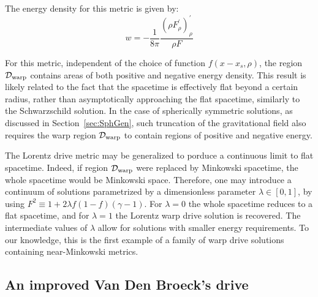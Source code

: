 \documentclass[10pt]{iopart}
\begin{document}
The energy density for this metric is given by:
\begin{equation}
   w = -\frac{1}{8\pi}\frac{(\rho F^\prime_\rho)^\prime_\rho}{\rho F}
\end{equation}

For this metric, independent of the choice of function $f(x-x_s,\rho)$, the region $\mathcal{D}_{\rm warp}$ contains areas of both positive and negative energy density. This result is likely related to the fact that the spacetime is effectively flat beyond a certain radius, rather than asymptotically approaching the flat spacetime, similarly to the Schwarzschild solution. In the case of spherically symmetric solutions, as discussed in Section~\ref{sec:SphGen}, such truncation of the gravitational field also requires the warp region $\mathcal{D}_{\rm warp}$ to contain regions of positive and negative energy.

The Lorentz drive metric may be generalized to porduce a continuous limit to flat spacetime. Indeed, if region $\mathcal{D}_{\rm warp}$ were replaced by Minkowski spacetime, the whole spacetime would be Minkowski space. Therefore, one may introduce a continuum of solutions parametrized by a dimensionless parameter $\lambda\in[0,1]$, by using $F^2\equiv 1+2\lambda f(1-f)(\gamma -1)$. For $\lambda = 0$ the whole spacetime reduces to a flat spacetime, and for $\lambda = 1$ the Lorentz warp drive solution is recovered. The intermediate values of $\lambda$ allow for solutions with smaller energy requirements. To our knowledge, this is the first example of a family of warp drive solutions containing near-Minkowski metrics.


\subsection{An improved Van Den Broeck's drive}
\end{document}
